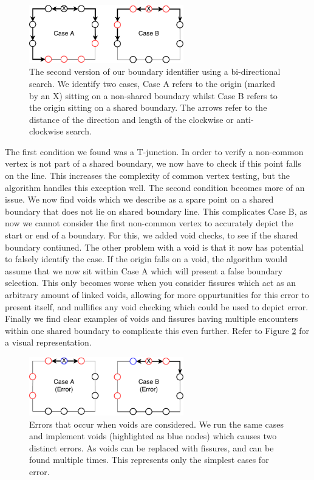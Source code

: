 \begin{figure}[b]
\includegraphics[width=0.6\textwidth]{images/ch6/search}
\caption{The second version of our boundary identifier using a bi-directional search. We identify two cases, Case A refers to the origin (marked by an X) sitting on a non-shared boundary whilst Case B refers to the origin sitting on a shared boundary. The arrows refer to the distance of the direction and length of the clockwise or anti-clockwise search.} \label{fig:searchA}
\end{figure}

The first condition we found was a T-junction. In order to verify a non-common vertex is not part of a shared boundary, we now have to check if this point falls on the line. This increases the complexity of common vertex testing, but the algorithm handles this exception well. The second condition becomes more of an issue. We now find voids which we describe as a spare point on a shared boundary that does not lie on shared boundary line. This complicates Case B, as now we cannot consider the first non-common vertex to accurately depict the start or end of a boundary. For this, we added void checks, to see if the shared boundary contiuned. The other problem with a void is that it now has potential to falsely identify the case. If the origin falls on a void, the algorithm would assume that we now sit within Case A which will present a false boundary selection. This only becomes worse when you consider fissures which act as an arbitrary amount of linked voids, allowing for more oppurtunities for this error to present itself, and nullifies any void checking which could be used to depict error. Finally we find clear examples of voids and fissures having multiple encounters within one shared boundary to complicate this even further. Refer to Figure \ref{fig:searchB} for a visual representation.

\begin{figure}[b]
\includegraphics[width=0.6\textwidth]{images/ch6/search2}
\caption{Errors that occur when voids are considered. We run the same cases and implement voids (highlighted as blue nodes) which causes two distinct errors. As voids can be replaced with fissures, and can be found multiple times. This represents only the simplest cases for error.} \label{fig:searchB}
\end{figure}

